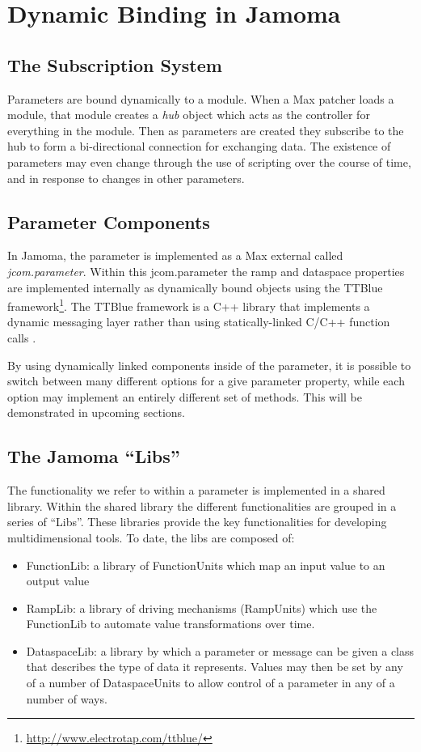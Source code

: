 \documentclass{article}
\begin{document}
\section{Dynamic Binding in Jamoma}

\subsection{The Subscription System}

Parameters are bound dynamically to a module.  When a Max patcher loads a module, that module creates a \emph{hub} object which acts as the controller for everything in the module.  Then as parameters are created they subscribe to the hub to form a bi-directional connection for exchanging data.  The existence of parameters may even change through the use of scripting over the course of time, and in response to changes in other parameters.

\subsection{Parameter Components}

In Jamoma, the parameter is implemented as a Max external called \emph{jcom.parameter}.  Within this jcom.parameter the ramp and dataspace properties are implemented internally as dynamically bound objects using the TTBlue framework\footnote{\url{http://www.electrotap.com/ttblue/}}.  The TTBlue framework is a C++ library that implements a dynamic messaging layer rather than using statically-linked C/C++ function calls \cite{Place:2008ttblue}.  

By using dynamically linked components inside of the parameter, it is possible to switch between many different options for a give parameter property, while each option may implement an entirely different set of methods.  This will be demonstrated in upcoming sections.

\subsection{The Jamoma ``Libs''}

The functionality we refer to within a parameter is implemented in a shared library. Within the shared library the different functionalities are grouped in a series of ``Libs''.  These libraries provide the key functionalities for developing multidimensional tools.  To date, the libs are composed of:
\begin{itemize}
	\item FunctionLib: a library of FunctionUnits which map an input value to an output value
	\item RampLib: a library of driving mechanisms (RampUnits) which use the FunctionLib to automate value transformations over time.
	\item DataspaceLib: a library by which a parameter or message can be given a class that describes the type of data it represents.  Values may then be set by any of a number of DataspaceUnits to allow control of a parameter in any of a number of ways.
\end{itemize}
\end{document}
